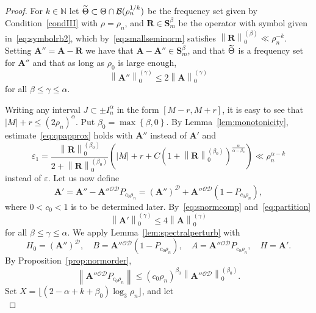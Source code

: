 \documentclass[10pt]{amsart}
\theoremstyle{definition}\newtheorem{defi}[theo]{Definition}\newtheorem{rema}[theo]{Remark}\newtheorem{exam}[theo]{Example}\newtheorem{nota}[theo]{Notation}
\newcommand{\N}{\mathbb N}
\newcommand{\CB}{\mathcal{B}}
\newcommand{\CD}{\mathcal{D}}
\newcommand{\CO}{\mathcal{O}}
\newcommand{\BA}{\mathbf A}
\newcommand{\BS}{\mathbf S}
\newcommand{\BR}{\mathbf R}
\newcommand{\eps}{\varepsilon}
\newcommand{\abs}[1]{\left\lvert #1 \right\rvert}
\newcommand{\set}[1]{\left\{ #1 \right\}}
\newcommand{\norm}[1]{\left\| #1 \right\|}
\newcommand{\snorm}[3]{\left\| #1\right\|_{#3}^{(#2)}}
\let\oldtilde\tilde
\renewcommand*{\tilde}[1]{\mathchoice{\widetilde{#1}}{\widetilde{#1}}{\oldtilde{#1}}{\oldtilde{#1}}}
\begin{document}
\begin{proof}
For $k \in \N$ let $\tilde \Theta \subset \Theta \cap \CB(\rho_n^{1/k})$ be the frequency set given by Condition~\ref{condIII} with $\rho = \rho_n$, and $\BR \in \BS^\beta_m$ be the operator with symbol given in~\eqref{eq:symbolrb2}, which by~\eqref{eq:smallseminorm} satisfies $\snorm{\BR}{\beta}{0}
\ll \rho_n^{-k}$. Setting $\BA'' = \BA - \BR$ we have that $\BA - \BA'' \in
\BS_m^{\beta}$, and that $\tilde \Theta$ is a frequency set for $\BA''$ and that as long as $\rho_0$ is large enough,
\begin{equation}\label{eq:snormcomp}
\snorm{\BA''}{\gamma}{0} \le 2 \snorm{\BA}{\gamma}{0}
\end{equation}
for all $\beta \le \gamma \le \alpha$.

Writing any interval $J \subset \pm I_n^\alpha$ in the form $[M - r,M+r]$, it is easy to see that $\abs M + r \le (2 \rho_n)^\alpha$. Put $\beta_0 = \max\set{\beta,0}$. By Lemma~\ref{lem:monotonicity}, estimate~\eqref{eq:qpapprox} holds with $\BA''$ instead of $\BA'$ and
\begin{equation}
\eps_1 = \frac{\snorm{\BR}{\beta_0}{0}}{2 + \snorm{\BR}{\beta_0}{0}}\left(\abs M + r + C\left(1 +
\snorm{\BR}{\beta_0}{0}\right)^\frac{\alpha}{\alpha - \beta_0}\right) \ll \rho_n^{\alpha - k}
\end{equation}
instead of $\eps$. Let us now define
\begin{equation}
\BA' = \BA'' - \BA''{}^{\CO\CD}P_{c_0\rho_n} = (\BA'')^\CD +
\BA''{}^{\CO\CD}(1 - P_{c_0 \rho_n}),
\end{equation}
where $0 < c_0 < 1$ is to be determined later. By~\eqref{eq:snormcomp} and~\eqref{eq:partition}
\begin{equation}
\snorm{\BA'}{\gamma}{0} \le 4 \snorm{\BA}{\gamma}{0}
\end{equation}
for all $\beta \le \gamma \le \alpha$. We apply Lemma~\ref{lem:spectralperturb} with
\begin{equation}
H_0 = (\BA'')^{\CD}, \quad B = \BA''{}^{\CO\CD}(1 - P_{c_0\rho_n}), \quad A =
\BA''{}^{\CO\CD}P_{c_0\rho_n}, \quad H = \BA'.
\end{equation}
By Proposition~\ref{prop:normorder},
\begin{equation}
\norm{\BA''{}^{\CO\CD}P_{c_0\rho_n}} \le (c_0 \rho_n)^{\beta_0}
\snorm{\BA''{}^{\CO\CD}}{\beta_0}{0}.
\end{equation}
Set $X = \lfloor (2 - \alpha + k + \beta_0) \log_3 \rho_n \rfloor$, and let
\begin{equation}\label{eq:increasingproj}

\end{equation}
\end{proof}
\end{document}
